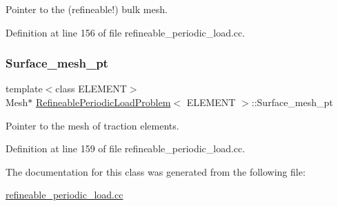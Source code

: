 Pointer to the (refineable!) bulk mesh. 



Definition at line 156 of file refineable\+\_\+periodic\+\_\+load.\+cc.

\mbox{\label{classRefineablePeriodicLoadProblem_a760d47dad3385febb9bd893afda424c2}} 
\subsubsection{\texorpdfstring{Surface\+\_\+mesh\+\_\+pt}{Surface\_mesh\_pt}}
{\footnotesize\ttfamily template$<$class E\+L\+E\+M\+E\+NT$>$ \\
Mesh$\ast$ \hyperlink{classRefineablePeriodicLoadProblem}{Refineable\+Periodic\+Load\+Problem}$<$ E\+L\+E\+M\+E\+NT $>$\+::Surface\+\_\+mesh\+\_\+pt\hspace{0.3cm}{\ttfamily [private]}}



Pointer to the mesh of traction elements. 



Definition at line 159 of file refineable\+\_\+periodic\+\_\+load.\+cc.



The documentation for this class was generated from the following file\+:\begin{DoxyCompactItemize}
\item 
\hyperlink{refineable__periodic__load_8cc}{refineable\+\_\+periodic\+\_\+load.\+cc}\end{DoxyCompactItemize}
